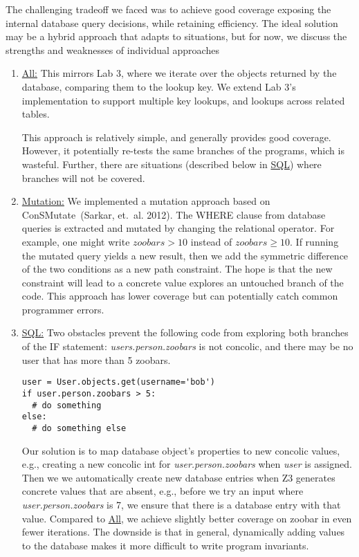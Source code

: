 \documentclass{scrartcl}
\begin{document}
The challenging tradeoff we faced was to achieve good coverage
exposing the internal database query decisions, while retaining
efficiency. The ideal solution may be a hybrid approach that adapts to
situations, but for now, we discuss the strengths and weaknesses of
individual approaches

\begin{enumerate}
\item \underline{All:}
  This mirrors Lab 3, where we iterate over the objects returned by
  the database, comparing them to the lookup key. We extend Lab 3's
  implementation to support multiple key lookups, and lookups across
  related tables.

  This approach is relatively simple, and generally provides good
  coverage. However, it potentially re-tests the same branches of the programs, which is wasteful. Further, there are situations (described
  below in \underline{SQL}) where branches will not be covered.

\item \underline{Mutation:}
  We implemented a mutation approach based on ConSMutate~(Sarkar,
  et.\ al. 2012). The WHERE clause from database queries is extracted
  and mutated by changing the relational operator. For example, one
  might write $\textit{zoobars} > 10$ instead of $\textit{zoobars}
  \geq 10$. If running the mutated query yields a new result, then we
  add the symmetric difference of the two conditions as a new path
  constraint. The hope is that the new constraint will lead to a
  concrete value explores an untouched branch of the code. This
  approach has lower coverage but can potentially catch common
  programmer errors.

\item \underline{SQL:}
  Two obstacles prevent the following code from exploring both
  branches of the IF statement: \textit{users.person.zoobars} is not
  concolic, and there may be no user that has more than 5 zoobars.
  \begin{verbatim}user = User.objects.get(username='bob')
if user.person.zoobars > 5:
  # do something
else:
  # do something else\end{verbatim}
  Our solution is to map database object's properties to new concolic
  values, e.g., creating a new concolic int for
  \textit{user.person.zoobars} when \textit{user} is assigned. Then we
  we automatically create new database entries when Z3 generates
  concrete values that are absent, e.g., before we try an input where
  \textit{user.person.zoobars} is 7, we ensure that there is a
  database entry with that value. Compared to \underline{All}, we
  achieve slightly better coverage on zoobar in even fewer iterations.
  The downside is that in general, dynamically adding values to the
  database makes it more difficult to write program invariants.
\end{enumerate}
\end{document}
